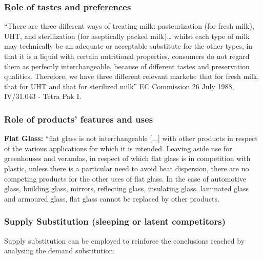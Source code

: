         \subsubsection{Role of tastes and preferences}

            “There are three different ways of treating milk: pasteurization (for fresh milk), UHT, and sterilization (for aseptically packed milk)… whilst each type of milk may technically be an adequate or acceptable substitute for the other types, in that it is a liquid with certain nutritional properties, consumers do not regard them as perfectly interchangeable, because of different tastes and preservation qualities. Therefore, we have three different relevant markets: that for fresh milk, that for UHT and that for sterilized milk” EC Commission 26 July 1988, IV/31.043 - Tetra Pak I.

        \subsubsection{Role of products’ features and uses}

            \textbf{Flat Glass:} “flat glass is not interchangeable [...] with other products in respect of the various applications for which it is intended. Leaving aside use for greenhouses and verandas, in respect of which flat glass is in competition with plastic, unless there is a particular need to avoid heat dispersion, there are no competing products for the other uses of flat glass. In the case of automotive glass, building glass, mirrors, reflecting glass, insulating glass, laminated glass and armoured glass, flat glass cannot be replaced by other products.

        \subsubsection{Supply Substitution (sleeping or latent competitors)}

            Supply substitution can be employed to reinforce the conclusions reached by analysing the demand substitution:


